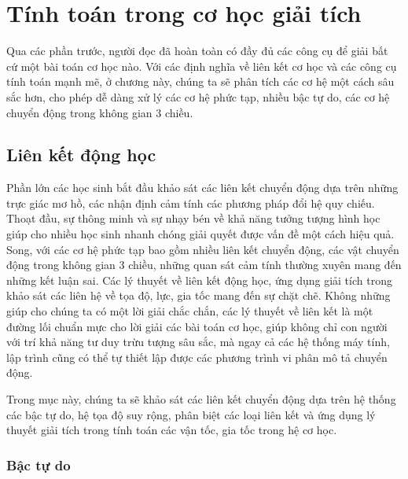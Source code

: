   
\chapter{Tính toán trong cơ học giải tích} \label{ch:10:Computational_mechanics}

Qua các phần trước, người đọc đã hoàn toàn có đầy đủ các công cụ để giải bất cứ một bài toán cơ học nào. Với các định nghĩa về liên kết cơ học và các công cụ tính toán mạnh mẽ, ở chương này, chúng ta sẽ phân tích các cơ hệ một cách sâu sắc hơn, cho phép dễ dàng xử lý các cơ hệ phức tạp, nhiều bậc tự do, các cơ hệ chuyển động trong không gian 3 chiều.

\section{Liên kết động học} \label{sec_10:Kinematic_link}

Phần lớn các học sinh bắt đầu khảo sát các liên kết chuyển động dựa trên những trực giác mơ hồ, các nhận định cảm tính các phương pháp đổi hệ quy chiếu.
Thoạt đầu, sự thông minh và sự nhạy bén về khả năng tưởng tượng hình học giúp cho nhiều học sinh nhanh chóng giải quyết được vấn đề một cách hiệu quả.
Song, với các cơ hệ phức tạp bao gồm nhiều liên kết chuyển động, các vật chuyển động trong không gian 3 chiều, những quan sát cảm tính thường xuyên mang đến những kết luận sai.
Các lý thuyết về liên kết động học, ứng dụng giải tích trong khảo sát các liên hệ về tọa độ, lực, gia tốc mang đến sự chặt chẽ.
Không những giúp cho chúng ta có một lời giải chắc chắn, các lý thuyết về liên kết là một đường lối chuẩn mực cho lời giải các bài toán cơ học, giúp không chỉ con người với trí khả năng tư duy trừu tượng sâu sắc, mà ngay cả các hệ thống máy tính, lập trình cũng có thể tự thiết lập được các phương trình vi phân mô tả chuyển động.

Trong mục này, chúng ta sẽ khảo sát các liên kết chuyển động dựa trên hệ thống các bậc tự do, hệ tọa độ suy rộng, phân biệt các loại liên kết và ứng dụng lý thuyết giải tích trong tính toán các vận tốc, gia tốc trong hệ cơ học.


\subsection{Bậc tự do}

